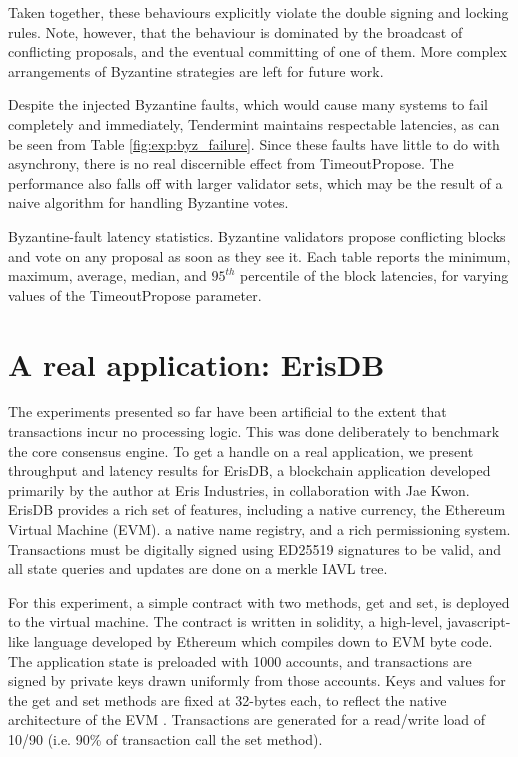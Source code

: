 Taken together, these behaviours explicitly violate the double signing and locking rules. 
Note, however, that the behaviour is dominated by the broadcast of conflicting proposals,
and the eventual committing of one of them.
More complex arrangements of Byzantine strategies are left for future work.
 
Despite the injected Byzantine faults, 
which would cause many systems to fail completely and immediately,
Tendermint maintains respectable latencies, as can be seen from Table \ref{fig:exp:byz_failure}.
Since these faults have little to do with asynchrony,
there is no real discernible effect from TimeoutPropose.
The performance also falls off with larger validator sets,
which may be the result of a naive algorithm for handling Byzantine votes.

\begin{table}[]
	
	\caption[Latency statistics under Byzantine faults]{Byzantine-fault latency statistics.
Byzantine validators propose conflicting blocks and vote on any proposal as soon as they see it.
Each table reports the minimum, maximum, average, median, and $95^{th}$ percentile of the block latencies, for varying values of the TimeoutPropose parameter.}
	\label{fig:exp:byz_failure}
\end{table}

\ifx
\section{A real application: ErisDB}

The experiments presented so far have been artificial to the extent that transactions incur no processing logic.
This was done deliberately to benchmark the core consensus engine. 
To get a handle on a real application, we present throughput and latency results for ErisDB, 
a blockchain application developed primarily by the author at Eris Industries, in collaboration with Jae Kwon.
ErisDB provides a rich set of features, including a native currency, the Ethereum Virtual Machine (EVM).
a native name registry, and a rich permissioning system.
Transactions must be digitally signed using ED25519 signatures to be valid, and all state queries and updates are done on a merkle IAVL tree.

For this experiment, a simple contract with two methods, get and set, is deployed to the virtual machine.
The contract is written in solidity, a high-level, javascript-like language developed by Ethereum which compiles down to EVM byte code.
The application state is preloaded with 1000 accounts, and transactions are signed by private keys drawn uniformly from those accounts.
Keys and values for the get and set methods are fixed at 32-bytes each, to reflect the native architecture of the EVM \cite{ethereum_yellow_paper}.
Transactions are generated for a read/write load of 10/90 (i.e. 90\% of transaction call the set method).

